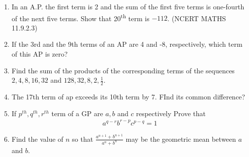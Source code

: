 \begin{enumerate}[label=\thesection.\arabic*,ref=\thesection.\theenumi]
\item In an A.P. the first term is 2 and the sum of the first five terms is one-fourth of the next five terms. Show that 20\textsuperscript{th} term is $-112$. \hfill(NCERT MATHS 11.9.2.3)\\
\solution

\pagebreak
\item If the 3rd and the 9th terms of an AP are 4 and -8, respectively, which term of this AP is zero? \\
\solution
\pagebreak
\item Find the sum of the products of the corresponding terms of the sequences $2, 4, 8, 16, 32$ and $128, 32, 8, 2, \frac{1}{2}$.
\solution
\pagebreak
\item The 17th term of ap exceeds its 10th term by 7. FInd its common difference?\\
 \solution
 
 \pagebreak
 \item If $p^{th},q^{th},r^{th} $ term of a GP are $a,b$ and $c$  respectively Prove that \\
\begin{align*}
    a^{q-r}b^{r-p}c^{p-q}=1
\end{align*}
\solution

\pagebreak
\item Find the value of $n$ so that $\frac{a^{n+1} + b^{n+1}}{a^{n}+b^{n}}$ may be the geometric mean between $a$ and $b$. \\
\solution

\pagebreak
\end{enumerate}
